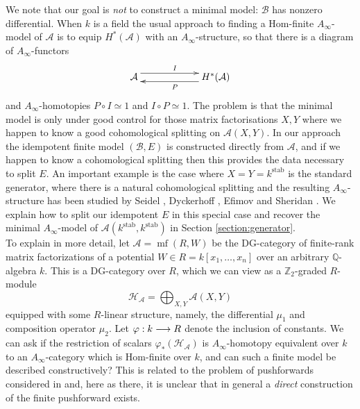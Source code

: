 \documentclass[english,letter paper,12pt,leqno]{article}
\theoremstyle{example}
\numberwithin{equation}{section}
\def\AA{\mathcal{A}}
\def\BB{\mathcal{B}}
\def\HH{\HH}
\def\HH{\mathcal{H}}
\def\stab{\operatorname{stab}}
\def\nZ{\mathds{Z}}
\DeclareMathOperator{\mfdg}{mf}
\begin{document}
We note that our goal is \emph{not} to construct a minimal model: $\BB$ has nonzero differential. When $k$ is a field the usual approach to finding a Hom-finite $A_\infty$-model of $\AA$ is to equip $H^*(\AA)$ with an $A_\infty$-structure, so that there is a diagram of $A_\infty$-functors
\[
\xymatrix@C+3pc{
\AA \ar@<1ex>[r]^I & H^*(\AA) \ar@<1ex>[l]^P
}
\]
and $A_\infty$-homotopies $P \circ I \simeq 1$ and $I \circ P \simeq 1$. The problem is that the minimal model is only under good control for those matrix factorisations $X,Y$ where we happen to know a good cohomological splitting on $\AA(X,Y)$. In our approach the idempotent finite model $(\BB,E)$ is constructed directly from $\AA$, and if we happen to know a cohomological splitting then this provides the data necessary to split $E$. An important example is the case where $X = Y = k^{\stab}$ is the standard generator, where there is a natural cohomological splitting and the resulting $A_\infty$-structure has been studied by Seidel \cite[\S 11]{seidel_hms}, Dyckerhoff \cite[\S 5.6]{d0904.4713}, Efimov \cite[\S 7]{efimov} and Sheridan \cite{sheridan}. We explain how to split our idempotent $E$ in this special case and recover the minimal $A_\infty$-model of $\AA(k^{\stab},k^{\stab})$ in Section \ref{section:generator}. 
\\

To explain in more detail, let $\AA = \mfdg(R,W)$ be the DG-category of finite-rank matrix factorizations of a potential $W \in R = k[x_1,\ldots,x_n]$ over an arbitrary $\mathbb{Q}$-algebra $k$. This is a DG-category over $R$, which we can view as a $\nZ_2$-graded $R$-module
\[
\HH_{\AA} = \bigoplus_{X,Y} \AA(X,Y)
\]
equipped with some $R$-linear structure, namely, the differential $\mu_1$ and composition operator $\mu_2$. Let $\varphi: k \longrightarrow R$ denote the inclusion of constants. We can ask if the restriction of scalars $\varphi_*( \HH_{\AA} )$ is $A_\infty$-homotopy equivalent over $k$ to an $A_\infty$-category which is Hom-finite over $k$, and can such a finite model be described constructively? This is related to the problem of pushforwards considered in \cite{pushforward} and, here as there, it is unclear that in general a \emph{direct} construction of the finite pushforward exists.
\end{document}
